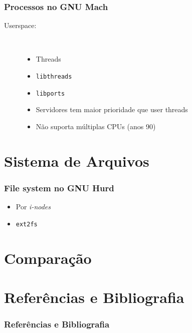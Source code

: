 \documentclass[10pt]{beamer}
\theoremstyle{plain}
\newcommand{\code}[1]{\lstinline[mathescape=true]{#1}}
\begin{document}
\begin{frame}
  \frametitle{Processos no GNU Mach}
  \begin{description}
    \item[Userspace:]~\\
      \begin{itemize}
        \item Threads
        \item \code{libthreads}
        \item \code{libports}
        \item Servidores tem maior prioridade que user threads
        \item Não suporta múltiplas CPUs (anos 90)
      \end{itemize}
  \end{description}
\end{frame}

\section{Sistema de Arquivos}

\begin{frame}
  \frametitle{File system no GNU Hurd}
  \begin{itemize}
    \item Por \textit{i-nodes}
    \item \code{ext2fs}
  \end{itemize}
\end{frame}

\section{Comparação}


\section[Referências]{Referências e Bibliografia}
\begin{frame}[t,allowframebreaks]
  \frametitle{Referências e Bibliografia}
  \footnotesize
  \nocite{*}
  \printbibliography[]
\end{frame}
\end{document}
